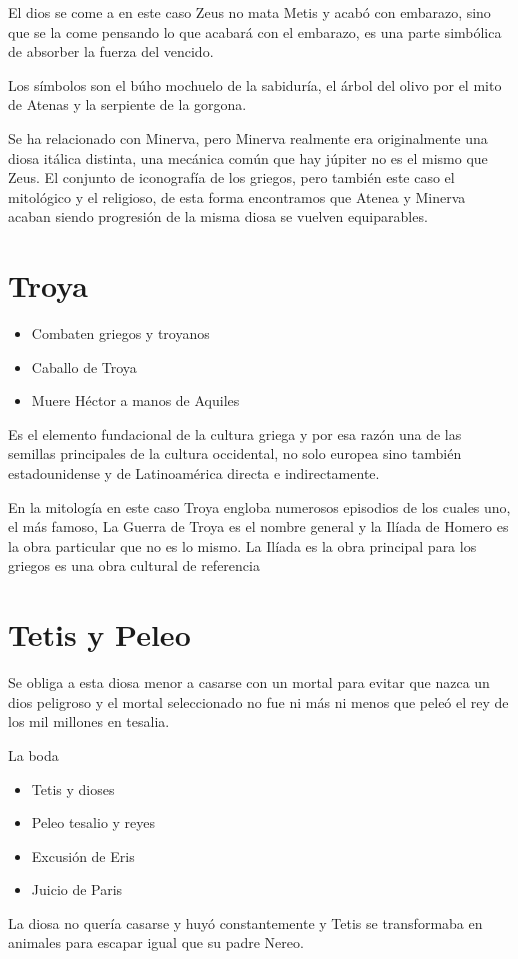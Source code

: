 El dios se come a en este caso Zeus no mata Metis y acabó con embarazo, sino que se la come pensando lo que acabará con el embarazo, es una parte simbólica de absorber la fuerza del vencido.

Los símbolos son el búho mochuelo de la sabiduría, el árbol del olivo por el mito de Atenas y la serpiente de la gorgona.

Se ha relacionado con Minerva, pero Minerva realmente era originalmente una diosa itálica distinta, una mecánica común que hay júpiter no es el mismo que Zeus. El conjunto de iconografía de los griegos, pero también este caso el mitológico y el religioso, de esta forma encontramos que Atenea y Minerva acaban siendo progresión de la misma diosa se vuelven equiparables.

\section{Troya}
\begin{itemize}
    \item Combaten griegos y troyanos
    \item Caballo de Troya
    \item Muere Héctor a manos de Aquiles
\end{itemize}

Es el elemento fundacional de la cultura griega y por esa razón una de las semillas principales de la cultura occidental, no solo europea sino también estadounidense y de Latinoamérica directa e indirectamente.

En la mitología en este caso Troya engloba numerosos episodios de los cuales uno, el más famoso, La Guerra de Troya es el nombre general y la Ilíada de Homero es la obra particular que no es lo mismo. La Ilíada es la obra principal para los griegos es una obra cultural de referencia

\section{Tetis y Peleo}
Se obliga a esta diosa menor a casarse con un mortal para evitar que nazca un dios peligroso y el mortal seleccionado no fue ni más ni menos que peleó el rey de los mil millones en tesalia.

La boda
\begin{itemize}
    \item Tetis y dioses
    \item Peleo tesalio y reyes
    \item Excusión de Eris
    \item Juicio de Paris
\end{itemize}
La diosa no quería casarse y huyó constantemente y Tetis se transformaba en animales para escapar igual que su padre Nereo.

